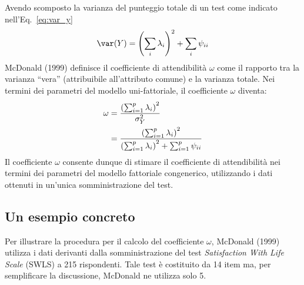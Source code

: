 Avendo scomposto la varianza del punteggio totale di un test
  come indicato nell'Eq.~\ref{eq:var_y}
$$
  \var(Y) = \left( \sum_i \lambda_i\right)^2 + \sum_i \psi_{ii}
$$
McDonald (1999) definisce il coefficiente di attendibilità $\omega$  come il rapporto tra la varianza ``vera''
  (attribuibile all'attributo comune) e la varianza totale.
Nei termini dei parametri del modello uni-fattoriale, il coefficiente $\omega$  diventa:
\begin{align}
\omega &= \frac{\left( \sum_{i=1}^p \lambda_i \right)^2}{\sigma_Y^2} \notag\\
&= \frac{\left( \sum_{i=1}^p \lambda_i \right)^2}{\left( \sum_{i=1}^p \lambda_i \right)^2  + \sum_{i=1}^p \psi_{ii}} 
\label{eq:omega}
\end{align} 
Il coefficiente $\omega$ consente dunque di stimare il coefficiente di attendibilità nei
termini dei parametri del modello fattoriale congenerico, utilizzando
i dati ottenuti in un'unica somministrazione del test. 

\subsection{Un esempio concreto}

Per illustrare la procedura per il calcolo del coefficiente $\omega$, 
McDonald (1999) utilizza i dati derivanti dalla somministrazione del test
{\it Satisfaction With Life Scale} (SWLS) a 215 rispondenti.  
Tale test è costituito da 14 item ma, per semplificare la discussione, McDonald ne utilizza solo 5. 




